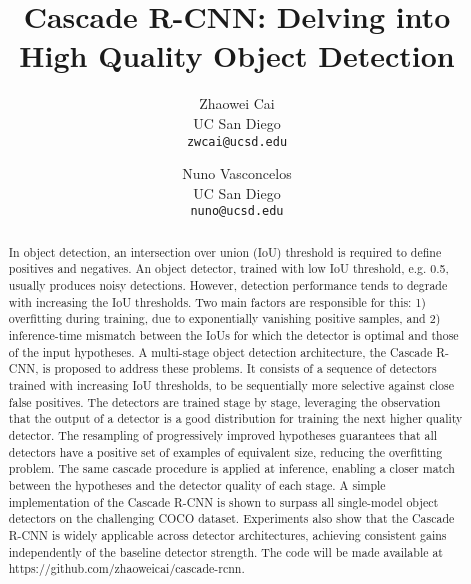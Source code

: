 \documentclass[10pt,twocolumn,letterpaper]{article}
\begin{document}
\title{Cascade R-CNN: Delving into High Quality Object Detection}

\author{Zhaowei Cai\\
UC San Diego\\
{\tt\small zwcai@ucsd.edu}
\and
Nuno Vasconcelos\\
UC San Diego\\
{\tt\small nuno@ucsd.edu}
}

\maketitle

\begin{abstract}
In object detection, an intersection over union (IoU) threshold is required to define positives and negatives. An object detector, trained with low IoU threshold, e.g. 0.5, usually produces noisy detections. However, detection performance tends to degrade with increasing the IoU thresholds. Two main factors are responsible for this: 1) overfitting during training, due to exponentially vanishing positive samples, and 2) inference-time mismatch between the IoUs for which the detector is optimal and those of the input hypotheses. A multi-stage object detection architecture, the Cascade R-CNN, is proposed to address these problems. It consists of a sequence of detectors trained with increasing IoU thresholds, to be sequentially more selective against close false positives. The detectors are trained stage by stage, leveraging the observation that the output of a detector is a good distribution for training the next higher quality detector. The resampling of progressively improved hypotheses guarantees that all detectors have a positive set of examples of equivalent size, reducing the overfitting problem. The same cascade procedure is applied at inference, enabling a closer match between the hypotheses and the detector quality of each stage. A simple implementation of the Cascade R-CNN is shown to surpass all single-model object detectors on the challenging COCO dataset. Experiments also show that the Cascade R-CNN is widely applicable across detector architectures, achieving consistent gains independently of the baseline detector strength. The code will be made available at https://github.com/zhaoweicai/cascade-rcnn.
\end{abstract}


\end{document}
